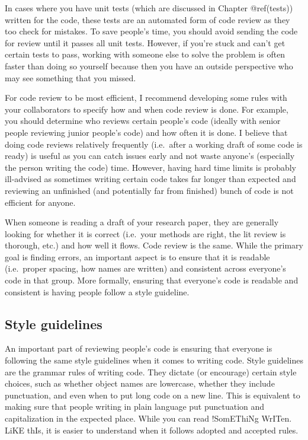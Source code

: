 \documentclass[
  a4paper,
]{krantz}
\begin{document}
In cases where you have unit tests (which are discussed in
Chapter @ref(tests)) written for the code, these tests are
an automated form of code review as they too check for
mistakes. To save people's time, you should avoid sending
the code for review until it passes all unit tests. However,
if you're stuck and can't get certain tests to pass, working
with someone else to solve the problem is often faster than
doing so yourself because then you have an outside
perspective who may see something that you missed.

For code review to be most efficient, I recommend developing
some rules with your collaborators to specify how and when
code review is done. For example, you should determine who
reviews certain people's code (ideally with senior people
reviewing junior people's code) and how often it is done. I
believe that doing code reviews relatively frequently
(i.e.~after a working draft of some code is ready) is useful
as you can catch issues early and not waste anyone's
(especially the person writing the code) time. However,
having hard time limits is probably ill-advised as sometimes
writing certain code takes far longer than expected and
reviewing an unfinished (and potentially far from finished)
bunch of code is not efficient for anyone.

When someone is reading a draft of your research paper, they
are generally looking for whether it is correct (i.e.~your
methods are right, the lit review is thorough, etc.) and how
well it flows. Code review is the same. While the primary
goal is finding errors, an important aspect is to ensure
that it is readable (i.e.~proper spacing, how names are
written) and consistent across everyone's code in that
group. More formally, ensuring that everyone's code is
readable and consistent is having people follow a style
guideline.

\hypertarget{style-guidelines}{%
\subsection{Style guidelines}\label{style-guidelines}}

An important part of reviewing people's code is ensuring
that everyone is following the same style guidelines when it
comes to writing code. Style guidelines are the grammar
rules of writing code. They dictate (or encourage) certain
style choices, such as whether object names are lowercase,
whether they include punctuation, and even when to put long
code on a new line. This is equivalent to making sure that
people writing in plain language put punctuation and
capitalization in the expected place. While you can read
!SomEThiNg WrITen. LiKE thIs, it is easier to understand
when it follows adopted and accepted rules.
\end{document}

